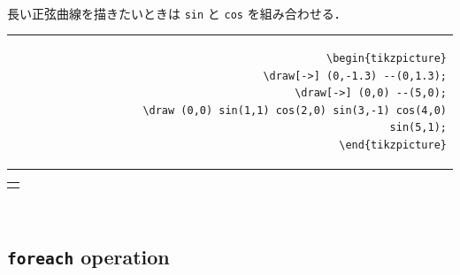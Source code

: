 \documentclass[lualatex]{jlreq}
\begin{document}
\\[1em]
長い正弦曲線を描きたいときは \verb|sin| と \verb|cos| を組み合わせる．
\\[0.5em]
\begin{minipage}{0.62 \textwidth}
    \begin{flushright}
        \begin{tabular}{r}
            \begin{lstlisting}[language={[LaTeX] TeX},
            numbers=none,breaklines=true,gobble=12,frame=none]
            \begin{tikzpicture}
                \draw[->] (0,-1.3) --(0,1.3);
                \draw[->] (0,0) --(5,0);
                \draw (0,0) sin(1,1) cos(2,0) sin(3,-1) cos(4,0) sin(5,1);
            \end{tikzpicture}
                \end{lstlisting}
        \end{tabular}
    \end{flushright}
\end{minipage}
\hfill
\begin{minipage}{0.32 \textwidth}
    \begin{flushleft}
        \begin{tabular}{l}
            \begin{tikzpicture}
                \draw[->] (0,-1.3) --(0,1.3);
                \draw[->] (0,0) --(5,0);
                \draw (0,0) sin(1,1) cos(2,0) sin(3,-1) cos(4,0) sin(5,1);
            \end{tikzpicture}
        \end{tabular}
    \end{flushleft}
\end{minipage}
\\[1em]

\subsection{\texttt{foreach} operation}
\end{document}

